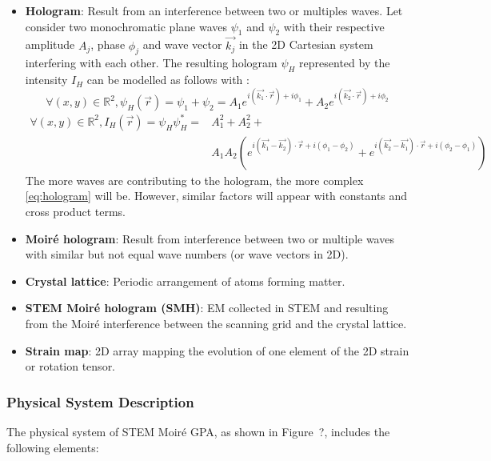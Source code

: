 \documentclass[12pt]{article}
\newcommand{\progname}{STEM Moir{\'e} GPA}
\begin{document}
\begin{itemize}
\begin{figure}[H]
\end{figure}
\item \textbf{Hologram}: Result from an interference between two or multiples waves. \newline
Let consider two monochromatic plane waves $\psi_1$ and $\psi_2$ with their respective amplitude $A_j$, phase $\phi_j$ and wave vector $\vec{k_j}$ in the 2D Cartesian system interfering with each other. The resulting hologram $\psi_H$ represented by the intensity $I_H$ can be modelled as follows with :
\begin{equation}
\forall (x,y) \in \mathbb{R}^{2}, \psi_H(\vec{r})=\psi_1+\psi_2= A_1e^{i(\vec{k_1}\cdot\vec{r})+i\phi_1}+A_2e^{i(\vec{k_2}\cdot\vec{r})+i\phi_2}
\end{equation}
\begin{equation}
\begin{split}
\forall (x,y) \in \mathbb{R}^{2}, I_H(\vec{r})=\psi_H\psi_H^{*}= & A_{1}^{2}+A_{2}^{2}+ \\ & A_{1}A_{2}(e^{i(\vec{k_1}-\vec{k_2})\cdot\vec{r}+i(\phi_1-\phi_2)}+e^{i(\vec{k_2}-\vec{k_1})\cdot\vec{r}+i(\phi_2-\phi_1)})
\end{split}
\label{eq:hologram}
\end{equation}
The more waves are contributing to the hologram, the more complex \cref{eq:hologram} will be. However, similar factors will appear with constants and cross product terms.
\item \textbf{Moir{\'e} hologram}: Result from interference between two or multiple waves with similar but not equal wave numbers (or wave vectors in 2D).
\item \textbf{Crystal lattice}: Periodic arrangement of atoms forming matter.
\item \textbf{STEM Moir{\'e} hologram (SMH)}: EM collected in STEM and resulting from the 
Moir{\'e} interference between the scanning grid and the crystal lattice. 
\item \textbf{Strain map}: 2D array mapping the evolution of one element of the 2D strain or rotation 
tensor. 
\end{itemize}

\subsubsection{Physical System Description}

The physical system of \progname{}, as shown in Figure~?,
includes the following elements:


\end{document}
